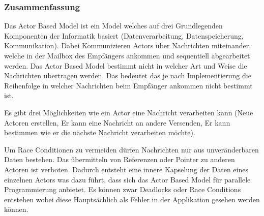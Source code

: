\subsubsection{Zusammenfassung}
Das Actor Based Model ist ein Model welches auf drei Grundlegenden Komponenten der Informatik basiert (Datenverarbeitung, Datenspeicherung, Kommunikation). Dabei Kommunizieren Actors über Nachrichten miteinander, welche in der Mailbox des Empfängers ankommen und sequentiell abgearbeitet werden. Das Actor Based Model bestimmt nicht in welcher Art und Weise die Nachrichten übertragen werden. Das bedeutet das je nach Implementierung die Reihenfolge in welcher Nachrichten beim Empfänger ankommen nicht bestimmt ist. 

Es gibt drei Möglichkeiten wie ein Actor eine Nachricht verarbeiten kann (Neue Actoren erstellen, Er kann eine Nachricht an andere Versenden, Er kann bestimmen wie er die nächste Nachricht verarbeiten möchte).

Um Race Conditionen zu vermeiden dürfen Nachrichten nur aus unveränderbaren Daten bestehen. Das übermitteln von Referenzen oder Pointer zu anderen Actoren ist verboten. Dadurch entsteht eine innere Kapselung der Daten eines einzelnen Actors was dazu führt, dass sich das Actor Based Model für parallele Programmierung anbietet. Es können zwar Deadlocks oder Race Conditions entstehen wobei diese Hauptsächlich als Fehler in der Applikation gesehen werden können. 

